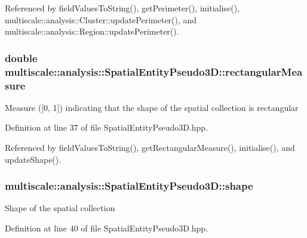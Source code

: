 \-Referenced by field\-Values\-To\-String(), get\-Perimeter(), initialise(), multiscale\-::analysis\-::\-Cluster\-::update\-Perimeter(), and multiscale\-::analysis\-::\-Region\-::update\-Perimeter().

\hypertarget{classmultiscale_1_1analysis_1_1SpatialEntityPseudo3D_aabb799c34513ed1d3008d807cdbdea29}{
\subsubsection[{rectangular\-Measure}]{\setlength{\rightskip}{0pt plus 5cm}double {\bf multiscale\-::analysis\-::\-Spatial\-Entity\-Pseudo3\-D\-::rectangular\-Measure}}}\label{classmultiscale_1_1analysis_1_1SpatialEntityPseudo3D_aabb799c34513ed1d3008d807cdbdea29}
\-Measure (\mbox{[}0, 1\mbox{]}) indicating that the shape of the spatial collection is rectangular 

\-Definition at line 37 of file \-Spatial\-Entity\-Pseudo3\-D.\-hpp.



\-Referenced by field\-Values\-To\-String(), get\-Rectangular\-Measure(), initialise(), and update\-Shape().

\hypertarget{classmultiscale_1_1analysis_1_1SpatialEntityPseudo3D_abad3acd3d7067e8e86e168e692cb2c2e}{
\subsubsection[{shape}]{ {\bf multiscale\-::analysis\-::\-Spatial\-Entity\-Pseudo3\-D\-::shape}}}\label{classmultiscale_1_1analysis_1_1SpatialEntityPseudo3D_abad3acd3d7067e8e86e168e692cb2c2e}
\-Shape of the spatial collection 

\-Definition at line 40 of file \-Spatial\-Entity\-Pseudo3\-D.\-hpp.



